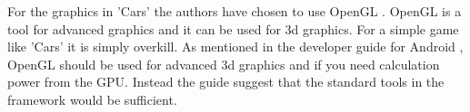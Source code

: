 For the graphics in 'Cars' the authors have chosen to use OpenGL \cite{opengl}.
OpenGL is a tool for advanced graphics and it can be used for 3d graphics.
For a simple game like 'Cars' it is simply overkill.
As mentioned in the developer guide for Android \cite{android_opengl}, OpenGL should be used for advanced 3d graphics and if you need calculation power from the GPU.
Instead the guide suggest that the standard tools in the framework would be sufficient.
